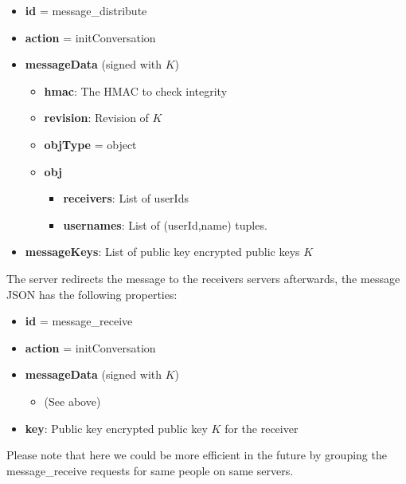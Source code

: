 \documentclass{scrartcl}
\begin{document}
\begin{itemize}
    \item \textbf{id} = message\_distribute
    \item \textbf{action} = initConversation
    \item \textbf{messageData} (signed with $K$)
  \begin{itemize}
    \item \textbf{hmac}: The HMAC to check integrity
    \item \textbf{revision}: Revision of $K$
    \item \textbf{objType} = object
     \item \textbf{obj}
     \begin{itemize}
        \item \textbf{receivers}: List of userIds
        \item \textbf{usernames}: List of (userId,name) tuples.
 \end{itemize}
    \end{itemize}
    \item \textbf{messageKeys}: List of public key encrypted public keys $K$
\end{itemize}


The server redirects the message to the receivers servers afterwards, the message JSON has the following properties:

\begin{itemize}
    \item \textbf{id} = message\_receive
    \item \textbf{action} = initConversation
    \item \textbf{messageData} (signed with $K$)
    \begin{itemize}
    \item (See above)

    \end{itemize}
    \item \textbf{key}: Public key encrypted public key $K$ for the receiver
\end{itemize}

Please note that here we could be more efficient in the future by grouping the message\_receive requests for same people on same servers.


%            
            
\end{document}
